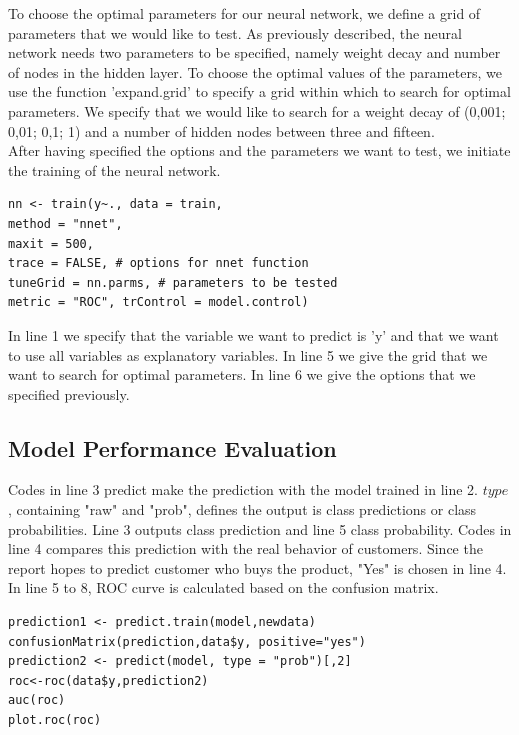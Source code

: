      To choose the optimal parameters for our neural network, we define a grid of parameters that we would like to test. As previously described, the neural network needs two parameters to be specified, namely weight decay and number of nodes in the hidden layer. To choose the optimal values of the parameters, we use the function 'expand.grid' to specify a grid within which to search for optimal parameters. We specify that we would like to search for a weight decay of (0,001; 0,01; 0,1; 1) and a number of hidden nodes between three and fifteen. \\
     [\baselineskip]\indent After having specified the options and the parameters we want to test, we initiate the training of the neural network.
     \begin{lstlisting}
nn <- train(y~., data = train,  
method = "nnet", 
maxit = 500, 
trace = FALSE, # options for nnet function
tuneGrid = nn.parms, # parameters to be tested
metric = "ROC", trControl = model.control)
     \end{lstlisting}
     In line 1 we specify that the variable we want to predict is 'y' and that we want to use all variables as explanatory variables. In line 5 we give the grid that we want to search for optimal parameters. In line 6 we give the options that we specified previously.
     \\
     \subsection{Model Performance Evaluation}
     \noindent Codes in line 3 predict make the prediction with the model trained in line 2. $type$, containing "raw" and "prob", defines the output is class predictions or class probabilities. Line 3 outputs class prediction and line 5 class probability. Codes in line 4 compares this prediction with the real behavior of customers. Since the report hopes to predict customer who buys the product, "Yes" is chosen in line 4. In line 5 to 8, ROC curve is calculated based on the confusion matrix.\\
     \begin{lstlisting}
prediction1 <- predict.train(model,newdata)
confusionMatrix(prediction,data$y, positive="yes")
prediction2 <- predict(model, type = "prob")[,2]
roc<-roc(data$y,prediction2)
auc(roc)
plot.roc(roc)
     \end{lstlisting}
     
     
    \newpage
    \pagestyle{fancy}
